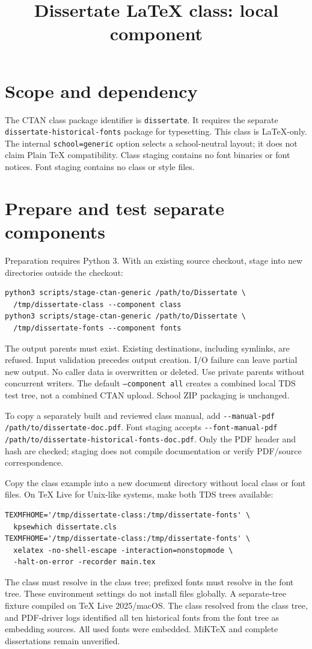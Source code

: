 \documentclass[10pt,letterpaper]{article}
\title{Dissertate LaTeX class: local component}
\author{}
\date{}
\begin{document}
\maketitle
\raggedright
\section*{Scope and dependency}
The CTAN class package identifier is \texttt{dissertate}. It requires the separate
\texttt{dissertate-historical-fonts} package for typesetting. This class is
LaTeX-only. The internal \texttt{school=generic} option selects a school-neutral
layout; it does not claim Plain TeX compatibility. Class staging contains no font
binaries or font notices. Font staging contains no class or style files.
\section*{Prepare and test separate components}
Preparation requires Python 3. With an existing source checkout, stage into new
directories outside the checkout:
\begin{verbatim}
python3 scripts/stage-ctan-generic /path/to/Dissertate \
  /tmp/dissertate-class --component class
python3 scripts/stage-ctan-generic /path/to/Dissertate \
  /tmp/dissertate-fonts --component fonts
\end{verbatim}
The output parents must exist. Existing destinations, including symlinks, are
refused. Input validation precedes output creation. I/O failure can leave partial
new output. No caller data is overwritten or deleted. Use private parents without
concurrent writers. The default \texttt{--component all} creates a combined local
TDS test tree, not a combined CTAN upload. School ZIP packaging is unchanged.

To copy a separately built and reviewed class manual, add
\verb|--manual-pdf /path/to/dissertate-doc.pdf|. Font staging accepts
\verb|--font-manual-pdf /path/to/dissertate-historical-fonts-doc.pdf|.
Only the PDF header and hash are checked; staging does not compile documentation
or verify PDF/source correspondence.

Copy the class example into a new document directory without local class or
font files. On TeX Live for Unix-like systems, make both TDS trees available:
\begin{verbatim}
TEXMFHOME='/tmp/dissertate-class:/tmp/dissertate-fonts' \
  kpsewhich dissertate.cls
TEXMFHOME='/tmp/dissertate-class:/tmp/dissertate-fonts' \
  xelatex -no-shell-escape -interaction=nonstopmode \
  -halt-on-error -recorder main.tex
\end{verbatim}
The class must resolve in the class tree; prefixed fonts must resolve in the font
tree. These environment settings do not install files globally. A separate-tree fixture
compiled on TeX Live 2025/macOS. The class resolved from the class tree, and
PDF-driver logs identified all ten historical fonts from the font tree as
embedding sources. All used fonts were embedded. MiKTeX and complete
dissertations remain unverified.
\end{document}
